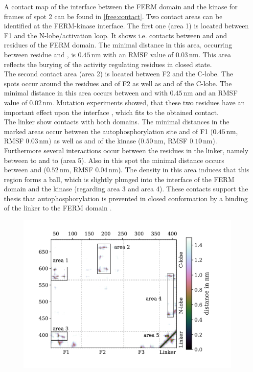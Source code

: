 %
%
%
A contact map of the interface between the FERM domain and the kinase for frames of spot 2 can be found in \autoref{free:contact}. Two contact areas can be identified at the FERM-kinase interface. The first one (area 1) is located between F1 and the N-lobe/activation loop. It shows i.e. contacts between  and  and residues of the FERM domain. The minimal distance in this area, occurring between residue  and , is $0.45\,\si{\nano\metre}$ with an RMSF value of $0.03\,\si{\nano\metre}$. This area reflects the burying of the activity regulating residues in closed state.\\
The second contact area (area 2) is located between F2 and the C-lobe. The spots occur around the residues  and  of F2 as well as  and  of the C-lobe. The minimal distance in this area occurs between  and  with $0.45\,\si{\nano\metre}$ and an RMSF value of $0.02\,\si{\nano\metre}$. Mutation experiments showed, that these two residues have an important effect upon the interface \autocite{structFAK}, which fits to the obtained contact.\\
The linker show contacts with both domains. The minimal distances in the marked areas occur between the autophosphorylation site  and  of F1 ($0.45\,\si{\nano\metre}$, RMSF $0.03\,\si{\nano\metre}$) as well as  and  of the kinase ($0.50\,\si{\nano\metre}$, RMSF $0.10\,\si{\nano\metre}$). Furthermore several interactions occur between the residues in the linker, namely between  to  and  to  (area 5). Also in this spot the minimal distance occurs between  and  ($0.52\,\si{\nano\metre}$, RMSF $0.04\,\si{\nano\metre}$). The density in this area induces that this region forms a ball, which is slightly plunged into the interface of the FERM domain and the kinase (regarding area 3 and area 4). These contacts support the thesis that autophosphorylation is prevented in closed conformation by a binding of the linker to the FERM domain \autocite{pap003}.\\ %
%
%
%
\begin{figure}
	\centering
	\includegraphics[width=.8\textwidth]{figures/results/contactmap_free}
	\label{free:contact}
\end{figure}
%
%
%
